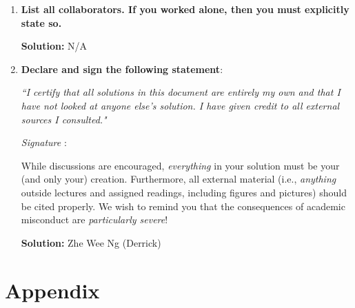 \documentclass{article}
\newcommand{\Question}[1]{\Large \section{ #1 } \normalsize}
\newenvironment{solution}{\color{blue} \smallskip \textbf{Solution:}}{}
\begin{document}
\begin{enumerate}
    \item 
    \textbf{List all collaborators. If you worked alone, then you must explicitly state so.}

    \begin{solution}
       N/A
    \end{solution}

    \item
    \textbf{Declare and sign the following statement}: 
    
    \textit{``I certify that all solutions in this document are entirely my own and that I have not looked at anyone else's solution. I have given credit to all external sources I consulted."}
    
    \textit{Signature} : \hrulefill
    
    While discussions are encouraged, \emph{everything} in your solution must be your (and only your) creation. 
    Furthermore, all external material  (i.e., \emph{anything} outside lectures and assigned
    readings, including figures and pictures) should be cited properly.
    We wish to remind you that the consequences of academic misconduct are \emph{particularly severe}!

    \begin{solution}
       Zhe Wee Ng (Derrick)
    \end{solution}

\end{enumerate}
\newpage
\Question{Appendix}
\end{document}
